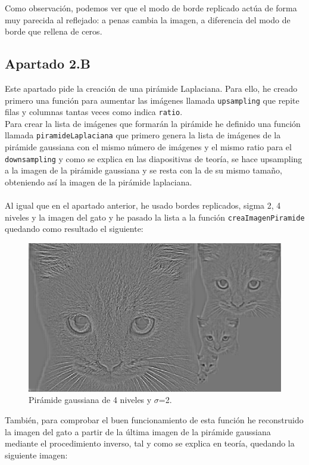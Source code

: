 \documentclass[12pt]{article}
\begin{document}
Como observación, podemos ver que el modo de borde replicado actúa de forma muy parecida al reflejado: a penas cambia la imagen, a diferencia del modo de borde que rellena de ceros.

\subsection*{Apartado 2.B}

Este apartado pide la creación de una pirámide Laplaciana. Para ello, he creado primero una función para aumentar las imágenes llamada \texttt{upsampling} que repite filas y columnas tantas veces como indica \texttt{ratio}.\\
Para crear la lista de imágenes que formarán la pirámide he definido una función llamada \texttt{piramideLaplaciana} que primero genera la lista de imágenes de la pirámide gaussiana con el mismo número de imágenes y el mismo ratio para el \texttt{downsampling} y como se explica en las diapositivas de teoría, se hace upsampling a la imagen de la pirámide gaussiana y se resta con la de su mismo tamaño, obteniendo así la imagen de la pirámide laplaciana.\\\\
Al igual que en el apartado anterior, he usado bordes replicados, sigma 2, 4 niveles y la imagen del gato y he pasado la lista a la función \texttt{creaImagenPiramide} quedando como resultado el siguiente:

\begin{figure}[H]
\centering
\includegraphics[scale=0.55]{images/PiramideLaplacianaGato.png} 
\caption{Pirámide gaussiana de 4 niveles y $\sigma$=2.}
\label{etiqueta}
\end{figure}

También, para comprobar el buen funcionamiento de esta función he reconstruido la imagen del gato a partir de la última imagen de la pirámide gaussiana mediante el procedimiento inverso, tal y como se explica en teoría, quedando la siguiente imagen:
\end{document}
